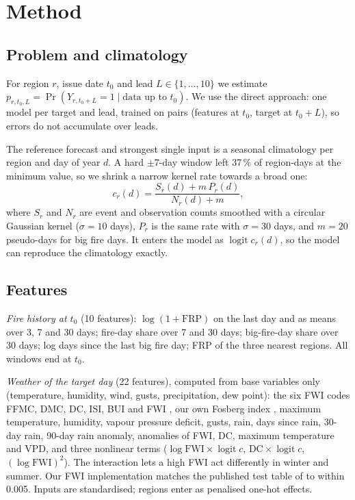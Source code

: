 \documentclass[conference,a4paper]{IEEEtran}
\newcommand{\logit}{\operatorname{logit}}
\begin{document}
\section{Method}

\subsection{Problem and climatology}
For region $r$, issue date $t_0$ and lead $L \in \{1,\dots,10\}$ we estimate
$p_{r,t_0,L} = \Pr(Y_{r,t_0+L} = 1 \mid \text{data up to } t_0)$. We use the direct approach: one model per target and
lead, trained on pairs (features at $t_0$, target at $t_0+L$), so errors do not accumulate over leads.

The reference forecast and strongest single input is a seasonal climatology per region and day of year $d$. A hard
$\pm 7$-day window left 37\,\% of region-days at the minimum value, so we shrink a narrow kernel rate towards a broad
one:
\begin{equation}
c_r(d) = \frac{S_r(d) + m\,P_r(d)}{N_r(d) + m},
\end{equation}
where $S_r$ and $N_r$ are event and observation counts smoothed with a circular Gaussian kernel ($\sigma = 10$ days),
$P_r$ is the same rate with $\sigma = 30$ days, and $m = 20$ pseudo-days for big fire days. It enters the model as
$\logit c_r(d)$, so the model can reproduce the climatology exactly.

\subsection{Features}
\emph{Fire history at $t_0$} (10 features): $\log(1{+}\text{FRP})$ on the last day and as means over 3, 7 and 30 days;
fire-day share over 7 and 30 days; big-fire-day share over 30 days; log days since the last big fire day; FRP of the
three nearest regions. All windows end at $t_0$.

\emph{Weather of the target day} (22 features), computed from base variables only (temperature, humidity, wind, gusts,
precipitation, dew point): the six FWI codes FFMC, DMC, DC, ISI, BUI and FWI \cite{vanwagner1985}, our own Fosberg
index \cite{fosberg1978,goodrick2002}, maximum temperature, humidity, vapour pressure deficit, gusts, rain, days since
rain, 30-day rain, 90-day rain anomaly, anomalies of FWI, DC, maximum temperature and VPD, and three nonlinear terms
($\log\text{FWI} \times \logit c$, $\text{DC} \times \logit c$, $(\log\text{FWI})^2$). The interaction lets a high FWI
act differently in winter and summer. Our FWI implementation matches the published test table of
\cite{vanwagner1985} to within 0.005. Inputs are standardised; regions enter as penalised one-hot effects.
\end{document}
